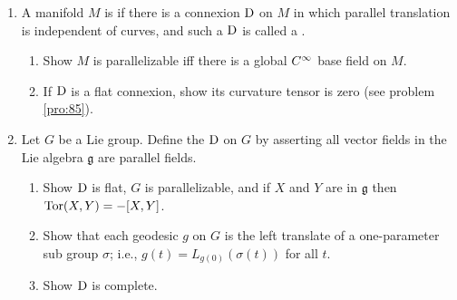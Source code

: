 \documentclass[../main]{subfiles}
\begin{document}
\begin{enumerate}
    \item\label{pro:45} A manifold $M$ is  if there is a connexion $\mathrm{D}$ on $M$ in which parallel translation is independent of curves, and such a $\mathrm{D}$ is called a . 
    \begin{enumerate}[label = (\roman*)]
        \item Show $M$ is parallelizable iff there is a global $C^\infty$ base field on $M$.
        \item If $\mathrm{D}$ is a flat connexion, show its curvature tensor is zero (see problem \ref{pro:85}).
    \end{enumerate}

    \item\label{pro:46} Let $G$ be a Lie group. Define the  $\mathrm{D}$ on $G$ by asserting all vector fields in the Lie algebra ${\mathfrak{g}}$ are parallel fields.
    \begin{enumerate}[label=(\roman*)]
        \item Show $\mathrm{D}$ is flat, $G$ is parallelizable, and if $X$ and $Y$ are in ${\mathfrak{g}}$ then $\mathrm{Tor}(X, Y)=-[X, Y]$.
        \item Show that each geodesic $g$ on $G$ is the left translate of a one-parameter sub group $\sigma$; i.e., $g(t)=L_{g(0)}(\sigma(t))$ for all $t$.
        \item Show $\mathrm{D}$ is complete.
     \end{enumerate}


\end{enumerate}
\end{document}
